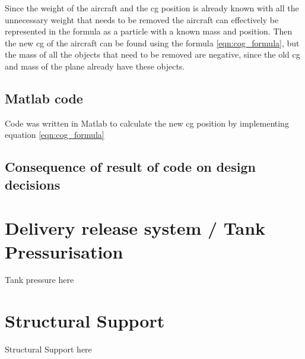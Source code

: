 Since the weight of the aircraft and the cg position is already known with all the unnecessary weight that needs to be removed the aircraft can effectively be represented in the formula as a particle with a known mass and position.
Then the new cg of the aircraft can be found using the formula \ref{eqn:cog_formula}, but the mass of all the objects that need to be removed are negative, since the old cg and mass of the plane already have these objects.



\subsection{Matlab code}
Code was written in Matlab to calculate the new cg position by implementing equation \ref{eqn:cog_formula}



\subsection{Consequence of result of code on design decisions}





















\section{Delivery release system / Tank Pressurisation}
Tank pressure here
\section{Structural Support}
Structural Support here
